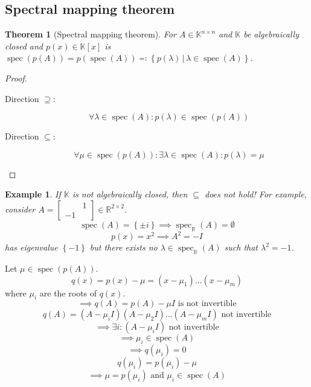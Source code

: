 \documentclass[a4paper]{article}
\newcounter{lecref}[section]
\numberwithin{lecref}{section}
\newtheorem{theorem}[lecref]{Theorem}
\newtheorem{example}[lecref]{Example}
\newcommand{\set}[1]{\left\{#1\right\}}
\newcommand{\setdef}[2]{\left\{\left.#1\,\right|\,#2\right\}}
\begin{document}
\subsection{Spectral mapping theorem}

\begin{theorem}[Spectral mapping theorem] %
  For $A \in \mathbb K^{n\times n}$ and $\mathbb K$ be algebraically closed and $p(x) \in \mathbb K[x]$
  is $\operatorname{spec}(p(A)) = p(\operatorname{spec}(A)) \eqqcolon \setdef{p(\lambda)}{\lambda \in \operatorname{spec}(A)}$.
\end{theorem}

\begin{proof}
  \begin{description}
    \item[Direction $\mathbf{\supseteq}$:]
      \[ \forall \lambda \in \operatorname{spec}(A): p(\lambda) \in \operatorname{spec}(p(A)) \]
    \item[Direction $\mathbf{\subseteq}$:]
      \[ \forall \mu \in \operatorname{spec}(p(A)): \exists \lambda \in \operatorname{spec}(A): p(\lambda) = \mu \]
  \end{description}
\end{proof}

\begin{example} %
  If $\mathbb K$ is not algebraically closed, then $\subseteq$ does not hold!
  For example, consider $A = \begin{bmatrix} & 1 \\ -1 & \end{bmatrix} \in \mathbb R^{2 \times 2}$.
  \[ \operatorname{spec}(A) = \set{\pm i} \implies \operatorname{spec}_{\mathbb R}(A) = \emptyset \]
  \[ p(x) = x^2 \implies A^2 = -I \]
  has eigenvalue $\set{-1}$ but there exists no $\lambda \in \operatorname{spec}_{\mathbb R}(A)$ such that $\lambda^2 = -1$.
\end{example}

Let $\mu \in \operatorname{spec}(p(A))$.
\[ q(x) = p(x) - \mu = (x - \mu_1) \dots (x - \mu_m) \]
where $\mu_i$ are the roots of $q(x)$.
\[ \implies q(A) = p(A) - \mu I \text{ is not invertible} \]
\[ q(A) = (A - \mu_i I)(A - \mu_2 I) \dots (A - \mu_m I) \text{ not invertible} \]
\[ \implies \exists i: (A - \mu_i I) \text{ not invertible} \]
\[ \implies \mu_i \in \operatorname{spec}(A) \]
\[ \implies q(\mu_i) = 0 \]
\[ q(\mu_i) = p(\mu_i) - \mu \]
\[ \implies \mu = p(\mu_i) \text{ and } \mu_i \in \operatorname{spec}(A) \]
\end{document}
